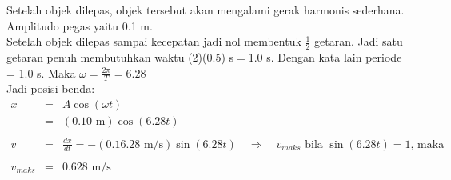 \begin{solution}
Setelah objek dilepas, objek tersebut akan mengalami gerak harmonis sederhana.\\
Amplitudo pegas yaitu 0.1 m.\\
Setelah objek dilepas sampai kecepatan jadi nol membentuk $\frac{1}{2}$ getaran. Jadi satu getaran penuh membutuhkan waktu (2)(0.5) s$=$1.0 s. Dengan kata lain periode = 1.0 s. Maka $\omega=\frac{2\pi}{T}=6.28$\\

Jadi posisi benda:
\begin{eqnarray*}
x&=&A\cos(\omega t)\\
&=&(0.10 \mbox{ m})\cos(6.28 t) \\
\\
v&=&\frac{dx}{dt}=-(0.1 6.28 \mbox{ m/s}) \sin(6.28 t) \quad \Rightarrow\quad \textrm{$v_{maks}$ bila $\sin(6.28t)=1$, maka} \\
\\
v_{maks}&=&0.628 \mbox{ m/s}
\end{eqnarray*}
\\[1.5cm]
\end{solution}
